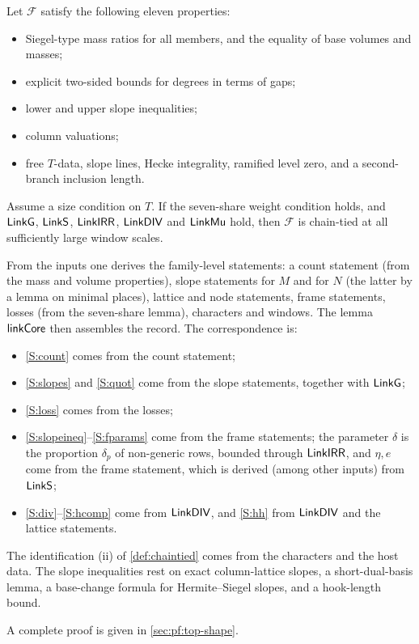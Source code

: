 \begin{theorem}\Fmark\label{thm:global-chain}
Let $\mathcal F$ satisfy the following eleven properties:
\begin{itemize}
\item Siegel-type mass ratios for all members, and the equality of base volumes and masses;
\item explicit two-sided bounds for degrees in terms of gaps;
\item lower and upper slope inequalities;
\item column valuations;
\item free $T$-data, slope lines, Hecke integrality, ramified level zero, and a second-branch
inclusion length.
\end{itemize}
Assume a size condition on $T$. If the seven-share weight condition holds, and $\mathsf{LinkG}$,
$\mathsf{LinkS}$, $\mathsf{LinkIRR}$, $\mathsf{LinkDIV}$ and $\mathsf{LinkMu}$ hold, then $\mathcal F$
is chain-tied at all sufficiently large window scales.
 
\end{theorem}

\begin{proofoutline}
From the inputs one derives the family-level statements: a count statement (from the mass and volume
properties), slope statements for $M$ and for $N$ (the latter by a lemma on minimal places), lattice
and node statements, frame statements, losses (from the seven-share lemma), characters and windows.
The lemma $\mathsf{linkCore}$ then assembles the record. The correspondence is:
\begin{itemize}
\item \ref{S:count} comes from the count statement;
\item \ref{S:slopes} and \ref{S:quot} come from the slope statements, together with $\mathsf{LinkG}$;
\item \ref{S:loss} comes from the losses;
\item \ref{S:slopeineq}--\ref{S:fparams} come from the frame statements; the parameter $\delta$ is the
proportion $\delta_p$ of non-generic rows, bounded through $\mathsf{LinkIRR}$, and $\eta,e$ come from the
frame statement, which is derived (among other inputs) from $\mathsf{LinkS}$;
\item \ref{S:div}--\ref{S:hcomp} come from $\mathsf{LinkDIV}$, and \ref{S:hh} from $\mathsf{LinkDIV}$ and the
lattice statements.
\end{itemize}
The identification (ii) of \cref{def:chaintied} comes from the characters and the host data. The
slope inequalities rest on exact column-lattice slopes, a short-dual-basis lemma, a base-change formula
for Hermite--Siegel slopes, and a hook-length bound.

A complete proof is given in \cref{sec:pf:top-shape}.
\end{proofoutline}

